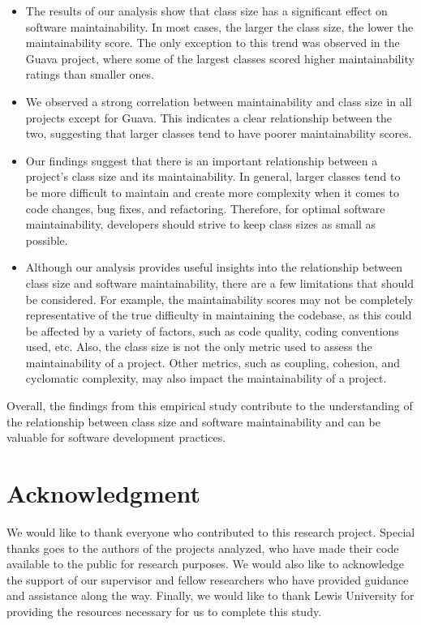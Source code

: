 \documentclass[conference]{IEEEtran}
\begin{document}
	\begin{itemize}
		\item The results of our analysis show that class size has a significant effect on software maintainability. In most cases, the larger the class size, the lower the maintainability score. The only exception to this trend was observed in the Guava project, where some of the largest classes scored higher maintainability ratings than smaller ones.
		
		\item We observed a strong correlation between maintainability and class size in all projects except for Guava. This indicates a clear relationship between the two, suggesting that larger classes tend to have poorer maintainability scores.
		
		\item Our findings suggest that there is an important relationship between a project's class size and its maintainability. In general, larger classes tend to be more difficult to maintain and create more complexity when it comes to code changes, bug fixes, and refactoring. Therefore, for optimal software maintainability, developers should strive to keep class sizes as small as possible.
		
		\item Although our analysis provides useful insights into the relationship between class size and software maintainability, there are a few limitations that should be considered. For example, the maintainability scores may not be completely representative of the true difficulty in maintaining the codebase, as this could be affected by a variety of factors, such as code quality, coding conventions used, etc. Also, the class size is not the only metric used to assess the maintainability of a project. Other metrics, such as coupling, cohesion, and cyclomatic complexity, may also impact the maintainability of a project.
	\end{itemize}

	Overall, the findings from this empirical study contribute to the understanding of the relationship between class size and software maintainability and can be valuable for software development practices.
		
	\section*{Acknowledgment}
	We would like to thank everyone who contributed to this research project. Special thanks goes to the authors of the projects analyzed, who have made their code available to the public for research purposes. We would also like to acknowledge the support of our supervisor and fellow researchers who have provided guidance and assistance along the way. Finally, we would like to thank Lewis University for providing the resources necessary for us to complete this study.
	
\end{document}
